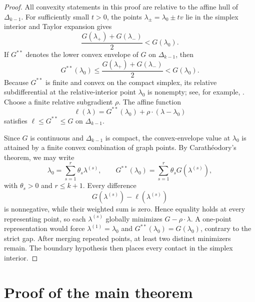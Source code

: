 \documentclass[11pt]{article}
\theoremstyle{plain}
\theoremstyle{definition}
\theoremstyle{remark}
\newcommand{\DeltaK}{\Delta_{k-1}}
\begin{document}
\begin{proof}
All convexity statements in this proof are relative to the affine hull of $\DeltaK$. For sufficiently small $t>0$, the points $\lambda_\pm=\lambda_0\pm tv$ lie in the simplex interior and Taylor expansion gives
\[
 \frac{G(\lambda_+)+G(\lambda_-)}2<G(\lambda_0).
\]
If $G^{**}$ denotes the lower convex envelope of $G$ on $\DeltaK$, then
\[
 G^{**}(\lambda_0)
 \le \frac{G(\lambda_+)+G(\lambda_-)}2
 <G(\lambda_0).
\]
Because $G^{**}$ is finite and convex on the compact simplex, its relative subdifferential at the relative-interior point $\lambda_0$ is nonempty; see, for example, \cite{Rockafellar}. Choose a finite relative subgradient $\rho$. The affine function
\[
 \ell(\lambda)=G^{**}(\lambda_0)+\rho\cdot(\lambda-\lambda_0)
\]
satisfies $\ell\le G^{**}\le G$ on $\DeltaK$.

Since $G$ is continuous and $\DeltaK$ is compact, the convex-envelope value at $\lambda_0$ is attained by a finite convex combination of graph points. By Carath\'eodory's theorem, we may write
\[
 \lambda_0=\sum_{s=1}^r\theta_s\lambda^{(s)},
 \qquad
 G^{**}(\lambda_0)=\sum_{s=1}^r\theta_sG(\lambda^{(s)}),
\]
with $\theta_s>0$ and $r\le k+1$. Every difference
\[
 G(\lambda^{(s)})-\ell(\lambda^{(s)})
\]
is nonnegative, while their weighted sum is zero. Hence equality holds at every representing point, so each $\lambda^{(s)}$ globally minimizes $G-\rho\cdot\lambda$. A one-point representation would force $\lambda^{(1)}=\lambda_0$ and $G^{**}(\lambda_0)=G(\lambda_0)$, contrary to the strict gap. After merging repeated points, at least two distinct minimizers remain. The boundary hypothesis then places every contact in the simplex interior.
\end{proof}

\section{Proof of the main theorem}
\end{document}
